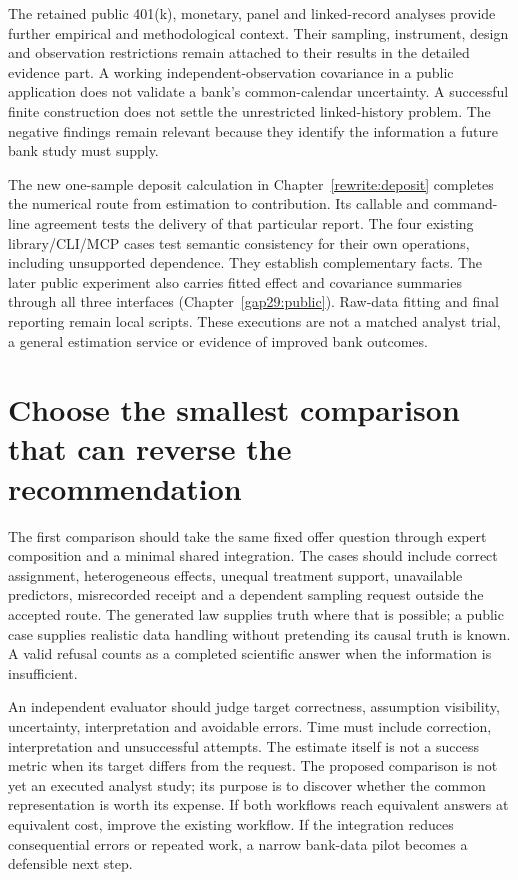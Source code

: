The retained public 401(k), monetary, panel and linked-record analyses
provide further empirical and methodological context. Their sampling,
instrument, design and observation restrictions remain attached to their
results in the detailed evidence part. A working independent-observation
covariance in a public application does not validate a bank's common-calendar
uncertainty. A successful finite construction does not settle the unrestricted
linked-history problem. The negative findings remain relevant because
they identify the information a future bank study must supply.

The new one-sample deposit calculation in Chapter~\ref{rewrite:deposit}
completes the numerical route from estimation to contribution. Its callable
and command-line agreement tests the delivery of that particular report.
The four existing library/CLI/MCP cases test semantic consistency for
their own operations, including unsupported dependence. They establish
complementary facts. The later public experiment also carries fitted effect and covariance
summaries through all three interfaces (Chapter~\ref{gap29:public}).
Raw-data fitting and final reporting remain local scripts. These executions
are not a matched analyst trial, a general estimation service or evidence
of improved bank outcomes.

\section{Choose the smallest comparison that can reverse the recommendation}
The first comparison should take the same fixed offer question through
expert composition and a minimal shared integration. The cases should
include correct assignment, heterogeneous effects, unequal treatment
support, unavailable predictors, misrecorded receipt and a dependent
sampling request outside the accepted route. The generated law supplies
truth where that is possible; a public case supplies realistic data handling
without pretending its causal truth is known. A valid refusal counts as
a completed scientific answer when the information is insufficient.

An independent evaluator should judge target correctness, assumption
visibility, uncertainty, interpretation and avoidable errors. Time must
include correction, interpretation and unsuccessful attempts. The estimate
itself is not a success metric when its target differs from the request.
The proposed comparison is not yet an executed analyst study; its purpose
is to discover whether the common representation is worth its expense.
If both workflows reach equivalent answers at equivalent cost, improve
the existing workflow. If the integration reduces consequential errors or
repeated work, a narrow bank-data pilot becomes a defensible next step.


